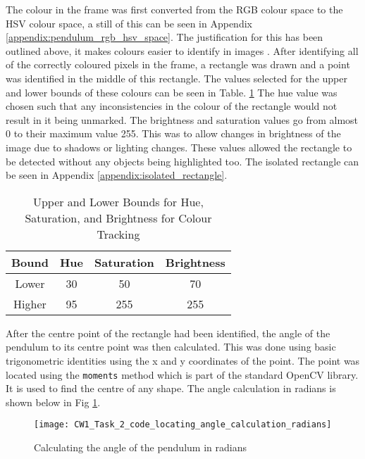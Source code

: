 \documentclass[conference]{IEEEtran}
\begin{document}
The colour in the frame was first converted from the RGB colour space to the HSV colour space, a still of this can be seen in Appendix \ref{appendix:pendulum_rgb_hsv_space}. The justification for this has been outlined above, it makes colours easier to identify in images \cite{ref:HSV_vs_RGB}. After identifying all of the correctly coloured pixels in the frame, a rectangle was drawn and a point was identified in the middle of this rectangle. 
The values selected for the upper and lower bounds of these colours can be seen in Table. \ref{table:upper_and_lower_bounds} The hue value was chosen such that any inconsistencies in the colour of the rectangle would not result in it being unmarked. The brightness and saturation values go from almost 0 to their maximum value 255. This was to allow changes in brightness of the image due to shadows or lighting changes.  These values allowed the rectangle to be detected without any objects being highlighted too. The isolated rectangle can be seen in Appendix \ref{appendix:isolated_rectangle}.

\begin{table}
\begin{center}
\caption{Upper and Lower Bounds for Hue, Saturation, and Brightness for Colour Tracking}
\begin{tabular}{ || c || c | c | c || }
\hline
 Bound & Hue & Saturation & Brightness \\ 
\hline
 Lower & 30 & 50 & 70 \\  
\hline
 Higher & 95 & 255 & 255 \\    
\hline

\end{tabular}
\label{table:upper_and_lower_bounds}
\end{center}
\end{table}

After the centre point of the rectangle had been identified, the angle of the pendulum to its centre point was then calculated. This was done using basic trigonometric identities using the x and y coordinates of the point. The point was located using the \verb|moments| method which is part of the standard OpenCV library. It is used to find the centre of any shape. The angle calculation in radians is shown below in Fig \ref{fig:CW1_Task_2_code_locating_angle_calculation_radians}. 

\begin{figure}
\centerline{\texttt{[image: CW1\_Task\_2\_code\_locating\_angle\_calculation\_radians]}}
\caption{Calculating the angle of the pendulum in radians}
\label{fig:CW1_Task_2_code_locating_angle_calculation_radians}
\end{figure}
\end{document}
